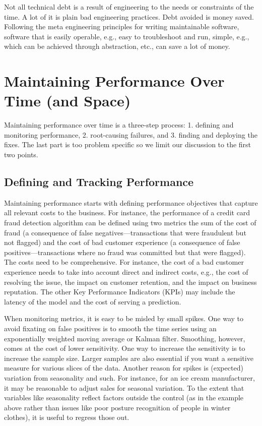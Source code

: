 \documentclass[12pt, letterpaper]{article}
\begin{document}
Not all technical debt is a result of engineering to the needs or constraints of the time. A lot of it is plain bad engineering practices. Debt avoided is money saved. Following the meta engineering principles for writing maintainable software, software that is easily operable, e.g., easy to troubleshoot and run, simple, e.g., which can be achieved through abstraction, etc., can save a lot of money.

\section{Maintaining Performance Over Time (and Space)}
Maintaining performance over time is a three-step process: 1. defining and monitoring performance, 2. root-causing failures, and 3. finding and deploying the fixes. The last part is too problem specific so we limit our discussion to the first two points.

\subsection{Defining and Tracking Performance}
Maintaining performance starts with defining performance objectives that capture all relevant costs to the business. For instance, the performance of a credit card fraud detection algorithm can be defined using two metrics the sum of the cost of fraud (a consequence of false negatives—transactions that were fraudulent but not flagged) and the cost of bad customer experience (a consequence of false positives—transactions where no fraud was committed but that were flagged).  The costs need to be comprehensive. For instance, the cost of a bad customer experience needs to take into account direct and indirect costs, e.g., the cost of resolving the issue, the impact on customer retention, and the impact on business reputation. The other Key Performance Indicators (KPIs) may include the latency of the model and the cost of serving a prediction.

When monitoring metrics, it is easy to be misled by small spikes. One way to avoid fixating on false positives is to smooth the time series using an exponentially weighted moving average or Kalman filter. Smoothing, however, comes at the cost of lower sensitivity. One way to increase the sensitivity is to increase the sample size. Larger samples are also essential if you want a sensitive measure for various slices of the data. Another reason for spikes is (expected) variation from seasonality and such. For instance, for an ice cream manufacturer, it may be reasonable to adjust sales for seasonal variation. To the extent that variables like seasonality reflect factors outside the control (as in the example above rather than issues like poor posture recognition of people in winter clothes), it is useful to regress those out. 
\end{document}
